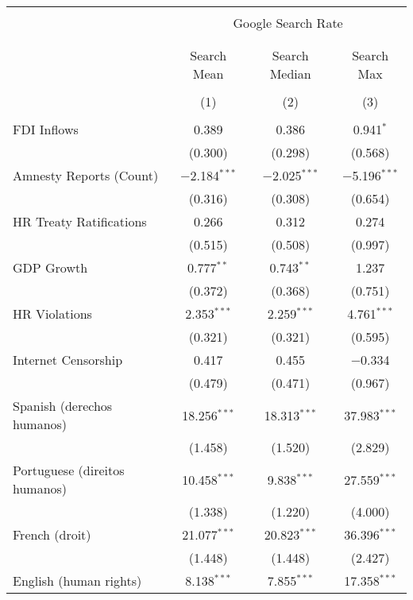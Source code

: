 
\begin{table}[!htbp] \centering 
  \caption{} 
  \label{} 
\begin{tabular}{@{\extracolsep{5pt}}lccc} 
\\[-1.8ex]\hline 
\hline \\[-1.8ex] 
 & \multicolumn{3}{c}{Google Search Rate} \\ 
\cline{2-4} 
\\[-1.8ex] & \multicolumn{3}{c}{ } \\ 
 & Search Mean & Search Median & Search Max \\ 
\\[-1.8ex] & (1) & (2) & (3)\\ 
\hline \\[-1.8ex] 
 FDI Inflows & 0.389 & 0.386 & 0.941$^{*}$ \\ 
  & (0.300) & (0.298) & (0.568) \\ 
  Amnesty Reports (Count) & $-$2.184$^{***}$ & $-$2.025$^{***}$ & $-$5.196$^{***}$ \\ 
  & (0.316) & (0.308) & (0.654) \\ 
  HR Treaty Ratifications & 0.266 & 0.312 & 0.274 \\ 
  & (0.515) & (0.508) & (0.997) \\ 
  GDP Growth & 0.777$^{**}$ & 0.743$^{**}$ & 1.237 \\ 
  & (0.372) & (0.368) & (0.751) \\ 
  HR Violations & 2.353$^{***}$ & 2.259$^{***}$ & 4.761$^{***}$ \\ 
  & (0.321) & (0.321) & (0.595) \\ 
  Internet Censorship & 0.417 & 0.455 & $-$0.334 \\ 
  & (0.479) & (0.471) & (0.967) \\ 
  Spanish (derechos humanos) & 18.256$^{***}$ & 18.313$^{***}$ & 37.983$^{***}$ \\ 
  & (1.458) & (1.520) & (2.829) \\ 
  Portuguese (direitos humanos) & 10.458$^{***}$ & 9.838$^{***}$ & 27.559$^{***}$ \\ 
  & (1.338) & (1.220) & (4.000) \\ 
  French (droit) & 21.077$^{***}$ & 20.823$^{***}$ & 36.396$^{***}$ \\ 
  & (1.448) & (1.448) & (2.427) \\ 
  English (human rights) & 8.138$^{***}$ & 7.855$^{***}$ & 17.358$^{***}$ \\ 

\end{tabular}
\end{table}
